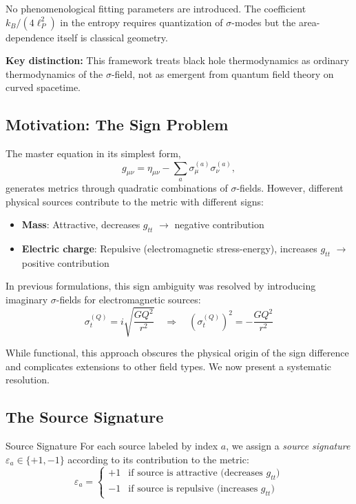 \documentclass[11pt,a4paper]{article}
\theoremstyle{definition}
\theoremstyle{remark}
\begin{document}
	\noindent No phenomenological fitting parameters are introduced. The coefficient $k_B/(4\ell_P^2)$ in the entropy requires quantization of $\sigma$-modes but the area-dependence itself is classical geometry.
	
	\vspace{1em}
	\noindent\textbf{Key distinction:} This framework treats black hole thermodynamics as ordinary thermodynamics of the $\sigma$-field, not as emergent from quantum field theory on curved spacetime.
	
	\subsection{Motivation: The Sign Problem}
	
	The master equation in its simplest form,
	\begin{equation}
		g_{\mu\nu} = \eta_{\mu\nu} - \sum_a \sigma_\mu^{(a)}\sigma_\nu^{(a)},
		\label{eq:master_naive}
	\end{equation}
	generates metrics through quadratic combinations of $\sigma$-fields. However, different physical sources contribute to the metric with different signs:
	
	\begin{itemize}
		\item \textbf{Mass}: Attractive, decreases $g_{tt}$ $\to$ negative contribution
		\item \textbf{Electric charge}: Repulsive (electromagnetic stress-energy), increases $g_{tt}$ $\to$ positive contribution
	\end{itemize}
	
	In previous formulations, this sign ambiguity was resolved by introducing imaginary $\sigma$-fields for electromagnetic sources:
	\begin{equation}
		\sigma_t^{(Q)} = i\sqrt{\frac{GQ^2}{r^2}} \quad \Rightarrow \quad (\sigma_t^{(Q)})^2 = -\frac{GQ^2}{r^2}
		\label{eq:imaginary_kludge}
	\end{equation}
	
	While functional, this approach obscures the physical origin of the sign difference and complicates extensions to other field types. We now present a systematic resolution.
	
	\subsection{The Source Signature}
	
	Source Signature
		For each source labeled by index $a$, we assign a \emph{source signature} $\varepsilon_a \in \{+1, -1\}$ according to its contribution to the metric:
		\begin{equation}
			\varepsilon_a = \begin{cases}
				+1 & \text{if source is attractive (decreases } g_{tt}\text{)} \\
				-1 & \text{if source is repulsive (increases } g_{tt}\text{)}
			\end{cases}
			\label{eq:signature_definition}
		\end{equation}
	
\end{document}
